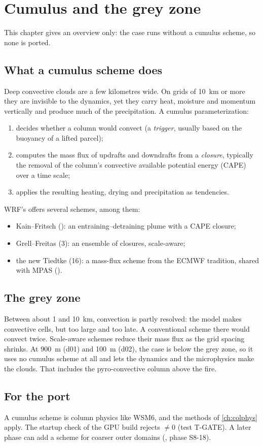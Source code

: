 \chapter{Cumulus and the grey zone}\label{ch:cu}

This chapter gives an overview only: the case runs without a cumulus scheme, so none is ported.

\section{What a cumulus scheme does}

Deep convective clouds are a few kilometres wide. On grids of 10~km or more they are invisible to the dynamics, yet
they carry heat, moisture and momentum vertically and produce much of the precipitation. A cumulus parameterization:
\begin{enumerate}
  \item decides whether a column would convect (a \emph{trigger}, usually based on the buoyancy of a lifted parcel);
  \item computes the mass flux of updrafts and downdrafts from a \emph{closure}, typically the removal of the
    column's convective available potential energy (CAPE) over a time scale;
  \item applies the resulting heating, drying and precipitation as tendencies.
\end{enumerate}
WRF's  offers several schemes, among them:
\begin{itemize}
  \item Kain--Fritsch (): an entraining--detraining plume with a CAPE closure;
  \item Grell--Freitas (3): an ensemble of closures, scale-aware;
  \item the new Tiedtke (16): a mass-flux scheme from the ECMWF tradition, shared with MPAS
    ().
\end{itemize}

\section{The grey zone}

Between about 1 and 10~km, convection is partly resolved: the model makes convective cells, but too large and too
late. A conventional scheme there would convect twice. Scale-aware schemes reduce their mass flux as the grid spacing
shrinks. At 900~m (d01) and 100~m (d02), the case is below the grey zone, so it uses no cumulus scheme at all and lets
the dynamics and the microphysics make the clouds. That includes the pyro-convective column above the fire.

\section{For the port}

A cumulus scheme is column physics like WSM6, and the methods of \cref{ch:colphys} apply. The startup check of the GPU
build rejects  $\ne 0$ (test T-GATE). A later phase can add a scheme for coarser outer domains
(, phase S8-18).
